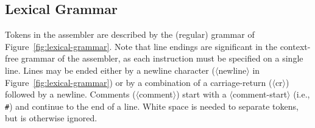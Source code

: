 \documentclass[11pt,letterpaper]{article}
\newcommand{\figref}[1]{Figure~\ref{#1}}  %
\renewcommand{\nonterm}[1]{\mbox{$\langle$\textrm{#1}$\rangle$}}
\begin{document}
\subsection{Lexical Grammar}

Tokens in the assembler are described by the (regular)
grammar of \figref{fig:lexical-grammar}.
Note that line endings are significant in the context-free grammar of
the assembler, as each instruction must be specified on a single line.
Lines may be ended either by a newline character (\nonterm{newline} in
\figref{fig:lexical-grammar})
or by a combination of a carriage-return (\nonterm{cr}) followed by a newline.
Comments (\nonterm{comment}) start with a \nonterm{comment-start} (i.e., \texttt{\#})
and continue to the end of a line.
White space is needed to separate tokens, but is otherwise ignored.
\end{document}
